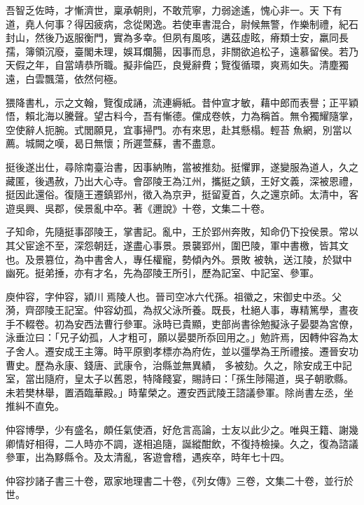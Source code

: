 \begin{pinyinscope}
 吾智乏佐時，才慚濟世，稟承朝則，不敢荒寧，力弱途遙，愧心非一。天
 下有道，堯人何事？得因疲病，念從閑逸。若使車書混合，尉候無警，作樂制禮，紀石封山，然後乃返服衡門，實為多幸。但夙有風咳，遘茲虛眩，瘠類士安，羸同長孺，簿領沉廢，臺閣未理，娛耳爛腸，因事而息，非關欲追松子，遠慕留侯。若乃天假之年，自當靖恭所職。擬非倫匹，良覺辭費；覽復循環，爽焉如失。清塵獨遠，白雲飄蕩，依然何極。



 猥降書札，示之文翰，覽復成誦，流連縟紙。昔仲宣才敏，藉中郎而表譽；正平穎悟，賴北海以騰聲。望古料今，吾有慚德。儻成卷帙，力為稱首。無令獨耀隨掌，空使辭人扼腕。式閭願見，宜事掃門。亦有來思，赴其懸榻。輕苔
 魚網，別當以薦。城闕之嘆，曷日無懷；所遲萱蘇，書不盡意。



 挺後遂出仕，尋除南臺治書，因事納賄，當被推劾。挺懼罪，遂變服為道人，久之藏匿，後遇赦，乃出大心寺。會邵陵王為江州，攜挺之鎮，王好文義，深被恩禮，挺因此還俗。復隨王遷鎮郢州，徵入為京尹，挺留夏首，久之還京師。太清中，客遊吳興、吳郡，侯景亂中卒。著《邇說》十卷，文集二十卷。



 子知命，先隨挺事邵陵王，掌書記。亂中，王於郢州奔敗，知命仍下投侯景。常以其父宦途不至，深怨朝廷，遂盡心事景。景襲郢州，圍巴陵，軍中書檄，皆其文也。及景篡位，為中書舍人，專任權寵，勢傾內外。景敗
 被執，送江陵，於獄中幽死。挺弟捶，亦有才名，先為邵陵王所引，歷為記室、中記室、參軍。



 庾仲容，字仲容，潁川焉陵人也。晉司空冰六代孫。祖徽之，宋御史中丞。父漪，齊邵陵王記室。仲容幼孤，為叔父泳所養。既長，杜絕人事，專精篤學，晝夜手不輟卷。初為安西法曹行參軍。泳時已貴顯，吏部尚書徐勉擬泳子晏嬰為宮僚，泳垂泣曰：「兄子幼孤，人才粗可，願以晏嬰所忝回用之。」勉許焉，因轉仲容為太子舍人。遷安成王主簿。時平原劉孝標亦為府佐，並以彊學為王所禮接。遷晉安功曹史。歷為永康、錢唐、武康令，治縣並無異績，
 多被劾。久之，除安成王中記室，當出隨府，皇太子以舊恩，特降餞宴，賜詩曰：「孫生陟陽道，吳子朝歌縣。未若樊林舉，置酒臨華殿。」時輩榮之。遷安西武陵王諮議參軍。除尚書左丞，坐推糾不直免。



 仲容博學，少有盛名，頗任氣使酒，好危言高論，士友以此少之。唯與王籍、謝幾卿情好相得，二人時亦不調，遂相追隨，誕縱酣飲，不復持檢操。久之，復為諮議參軍，出為黟縣令。及太清亂，客遊會稽，遇疾卒，時年七十四。



 仲容抄諸子書三十卷，眾家地理書二十卷，《列女傳》三卷，文集二十卷，並行於世。




\end{pinyinscope}
